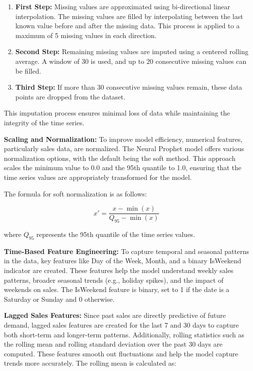 \begin{enumerate}
    \item \textbf{First Step:} Missing values are approximated using bi-directional linear interpolation. The missing values are filled by interpolating between the last known value before and after the missing data. This process is applied to a maximum of 5 missing values in each direction.
    \item \textbf{Second Step:} Remaining missing values are imputed using a centered rolling average. A window of 30 is used, and up to 20 consecutive missing values can be filled.
    \item \textbf{Third Step:} If more than 30 consecutive missing values remain, these data points are dropped from the dataset.
\end{enumerate}

This imputation process ensures minimal loss of data while maintaining the integrity of the time series.

\textbf{Scaling and Normalization:} To improve model efficiency, numerical features, particularly sales data, are normalized. The Neural Prophet model offers various normalization options, with the default being the soft method. This approach scales the minimum value to 0.0 and the 95th quantile to 1.0, ensuring that the time series values are appropriately transformed for the model. 

The formula for soft normalization is as follows:

\[
x' = \frac{x - \min(x)}{Q_{95} - \min(x)}
\]

where \( Q_{95} \) represents the 95th quantile of the time series values.

\textbf{Time-Based Feature Engineering:} To capture temporal and seasonal patterns in the data, key features like Day of the Week, Month, and a binary IsWeekend indicator are created. These features help the model understand weekly sales patterns, broader seasonal trends (e.g., holiday spikes), and the impact of weekends on sales. The IsWeekend feature is binary, set to 1 if the date is a Saturday or Sunday and 0 otherwise.

\textbf{Lagged Sales Features:} Since past sales are directly predictive of future demand, lagged sales features are created for the last 7 and 30 days to capture both short-term and longer-term patterns. Additionally, rolling statistics such as the rolling mean and rolling standard deviation over the past 30 days are computed. These features smooth out fluctuations and help the model capture trends more accurately. The rolling mean is calculated as:

